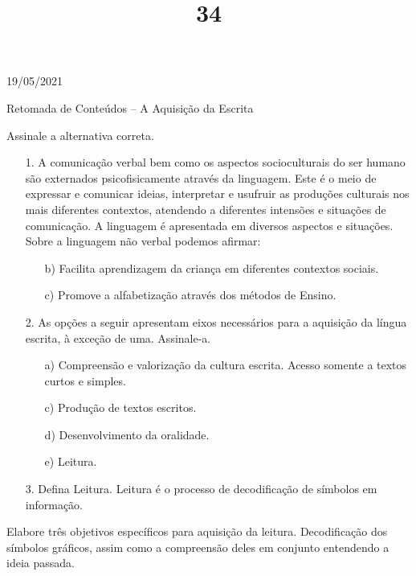 \documentclass{SchoolBook}
\begin{document}
    \begin{day}{19/05/2021}
        \title{3}{Retomada de Conteúdos -- A Aquisição da Escrita}
        \title{4}{Assinale a alternativa correta.}
        
        \begin{enumerate}
            \item[1.] A comunicação verbal bem como os aspectos socioculturais do ser humano são externados psicofisicamente através da linguagem. Este é o meio de expressar e comunicar ideias, interpretar e usufruir as produções culturais nos mais diferentes contextos, atendendo a diferentes intensões e situações de comunicação. A linguagem é apresentada em diversos aspectos e situações. Sobre a linguagem não verbal podemos afirmar:
            \begin{enumerate}[nosep]
                \itemc[a)] Promove a comunicação de ideias, utilizando símbolos gráficos, imagens e, não necessariamente letras.
                \item[b)] Facilita aprendizagem da criança em diferentes contextos sociais.
                \item[c)] Promove a alfabetização através dos métodos de Ensino.
            \end{enumerate}
            
            \item[2.] As opções a seguir apresentam eixos necessários para a aquisição da língua escrita, à exceção de uma. Assinale-a.
            \begin{enumerate}[nosep]
                \item[a)] Compreensão e valorização da cultura escrita.
                \itemc[b)] Acesso somente a textos curtos e simples.
                \item[c)] Produção de textos escritos.
                \item[d)] Desenvolvimento da oralidade.
                \item[e)] Leitura.
            \end{enumerate}
            
            \item[3.] Defina Leitura.
            \response Leitura é o processo de decodificação de símbolos em informação.
        \end{enumerate}
        
        Elabore três objetivos específicos para aquisição da leitura.
        \response Decodificação dos símbolos gráficos, assim como a compreensão deles em conjunto entendendo a ideia passada.
    \end{day}
\end{document}
